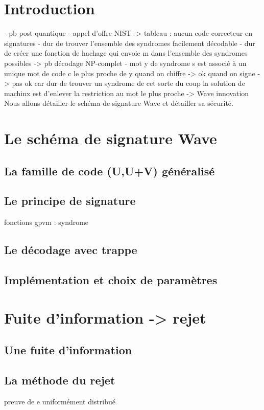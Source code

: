 \documentclass[12pt]{article}
\theoremstyle{definition}
\begin{document}
\section*{Introduction}

- pb post-quantique
- appel d'offre NIST
	-> tableau : aucun code correcteur en signatures
- dur de trouver l'ensemble des syndromes facilement décodable
- dur de créer une fonction de hachage qui envoie m dans l'ensemble des syndromes possibles
-> pb décodage NP-complet
- mot y de syndrome s est associé à un unique mot de code c le plus proche de y
quand on chiffre -> ok
quand on signe -> pas ok car dur de trouver un syndrome de cet sorte
du coup la solution de machinx est d'enlever la restriction au mot le plus proche
-> Wave innovation 
Nous allons détailler le schéma de signature Wave et détailler sa sécurité.

\section{Le schéma de signature Wave}
\subsection{La famille de code (U,U+V) généralisé}
\subsection{Le principe de signature}
fonctions gpvm : syndrome
\subsection{Le décodage avec trappe}
\subsection{Implémentation et choix de paramètres}

\section{Fuite d'information -> rejet}
\subsection{Une fuite d'information}
\subsection{La méthode du rejet}
preuve de e uniformément distribué
\end{document}
